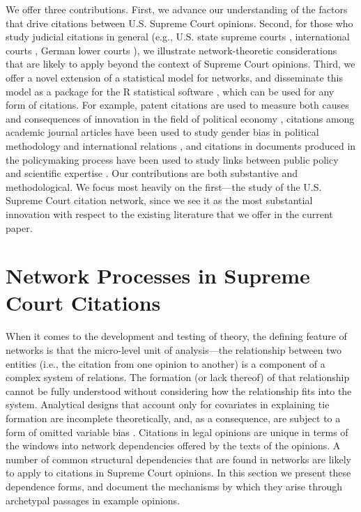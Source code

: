 \documentclass{cup-pan}
\begin{document}
We offer three contributions. First, we advance our understanding of the factors that drive citations between U.S. Supreme Court opinions. Second, for those who study judicial citations in general (e.g., U.S. state supreme courts \citep{hinkle2016transmission}, international courts \citep{lupu2012precedent},  German lower courts \citep{berlemann2020disposition}), we illustrate network-theoretic considerations that are likely to apply beyond the context of Supreme Court opinions. Third, we offer a novel extension of a statistical model for networks, and disseminate this model as a package for the R statistical software \citep{cergm}, which can be used for any form of citations. For example, patent citations are used to measure both causes and consequences of innovation in the field of political economy \citep{akcigit2018growth,dincer2019does}, citations among academic journal articles have been used to study gender bias in political methodology \citep{dion2018gendered} and international relations \citep{maliniak2013gender}, and citations in documents produced in the policymaking process have been used to study links between public policy and scientific expertise \citep{costa2016science,koontz2018use}. Our contributions are both substantive and methodological. We focus most heavily on the first---the study of the U.S. Supreme Court citation network, since we see it as the most substantial innovation with respect to the existing literature that we offer in the current paper.

\section{Network Processes in Supreme Court Citations} 

When it comes to the development and testing of theory, the defining feature of networks is that the micro-level unit of analysis---the relationship between two entities (i.e., the citation from one opinion to another) is a component of a complex system of relations. The formation (or lack thereof) of that relationship cannot be fully understood without considering how the relationship fits into the system. Analytical designs that account only for covariates in explaining tie formation are incomplete theoretically, and, as a consequence, are subject to a form of omitted variable bias \citep{cranmer2016critique}. Citations in legal opinions are unique in terms of the windows into network dependencies offered by the texts of the opinions. A number of common structural dependencies that are found in networks are likely to apply to citations in Supreme Court opinions. In this section we present these dependence forms, and document the mechanisms by which they arise through archetypal passages in example opinions. 
\end{document}
